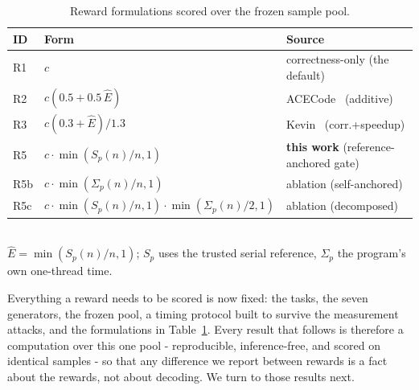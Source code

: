 \begin{table}[t]
\caption{Reward formulations scored over the frozen sample pool.}
\label{tab:rewards}
\centering
\footnotesize
\begin{tabular}{@{}llp{2.7cm}@{}}
\toprule
ID & Form & Source \\
\midrule
R1 & $c$ & correctness-only (the default) \\
R2 & $c(0.5 + 0.5\,\hat{E})$ & ACECode~\cite{acecode} (additive) \\
R3 & $c(0.3 + \hat{E})/1.3$ & Kevin~\cite{kevin} (corr.+speedup) \\
R5 & $c\cdot\min(S_p(n)/n,1)$ & \textbf{this work} (reference-anchored gate) \\
R5b & $c\cdot\min(\Sigma_p(n)/n,1)$ & ablation (self-anchored) \\
R5c & $c\cdot\min(S_p(n)/n,1)\cdot\min(\Sigma_p(n)/2,1)$ & ablation (decomposed) \\
\bottomrule
\end{tabular}
\\[2pt]
{\footnotesize $\hat{E}=\min(S_p(n)/n,1)$; $S_p$ uses the trusted serial
reference, $\Sigma_p$ the program's own one-thread time.}
\end{table}

Everything a reward needs to be scored is now fixed: the tasks, the seven
generators, the frozen pool, a timing protocol built to survive the measurement
attacks, and the formulations in Table~\ref{tab:rewards}. Every result that
follows is therefore a computation over this one pool - reproducible,
inference-free, and scored on identical samples - so that any difference we
report between rewards is a fact about the rewards, not about decoding. We turn
to those results next.
